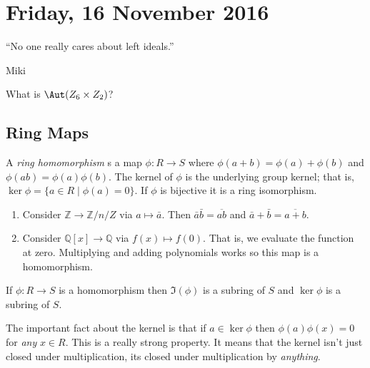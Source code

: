 \section{Friday, 16 November 2016}

\epigraph{``No one really cares about left ideals.''}{Miki}

\begin{problem}
What is $\Aut(Z_6 \times Z_2)$?
\end{problem}

\subsection{Ring Maps}

\begin{definition}
A \emph{ring homomorphism} s a map $\phi : R \to S$ where $\phi(a + b) = \phi(a) + \phi(b)$ and $\phi(ab) = \phi(a)\phi(b)$. The kernel of $\phi$ is the underlying group kernel; that is, $\ker \phi = \{a \in R \mid \phi(a) = 0\}$. If $\phi$ is bijective it is a ring isomorphism.
\end{definition}

\begin{example}
\begin{enumerate}
\item Consider $\mathbb{Z} \to \mathbb{Z}/n/Z$ via $a \mapsto \bar{a}$. Then $\bar{a}\bar{b} = \overline{ab}$ and $\bar{a} + \bar{b} = \overline{a + b}$.
\item Consider $\mathbb{Q}[x] \to \mathbb{Q}$ via $f(x) \mapsto f(0)$. That is, we evaluate the function at zero. Multiplying and adding polynomials works so this map is a homomorphism.
\end{enumerate}
\end{example}

\begin{proposition}
If $\phi : R \to S$ is a homomorphism then $\Im(\phi)$ is a subring of $S$ and $\ker \phi$ is a subring of $S$.
\end{proposition}

\begin{corollary}
The important fact about the kernel is that if $a \in \ker\phi$ then $\phi(a)\phi(x) = 0$ for \emph{any} $x \in R$. This is a really strong property. It means that the kernel isn't just closed under multiplication, its closed under multiplication by \emph{anything}.
\end{corollary}

